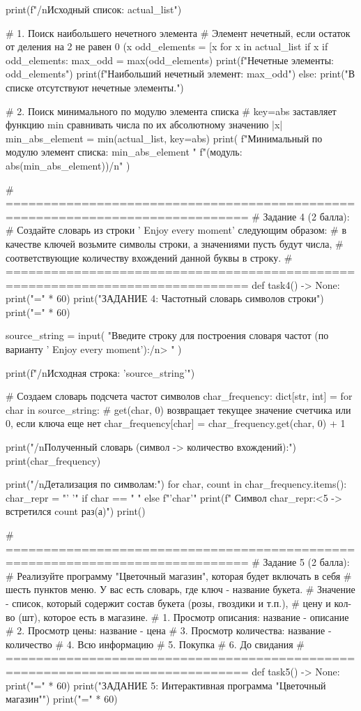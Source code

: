 \documentclass[14pt,a4paper]{extarticle}
\begin{document}
\begin{CodeListing}
    print(f"/nИсходный список: {actual_list}")

    # 1. Поиск наибольшего нечетного элемента
    # Элемент нечетный, если остаток от деления на 2 не равен 0 (x %
    odd_elements = [x for x in actual_list if x %
    if odd_elements:
        max_odd = max(odd_elements)
        print(f"Нечетные элементы: {odd_elements}")
        print(f"Наибольший нечетный элемент: {max_odd}")
    else:
        print("В списке отсутствуют нечетные элементы.")

    # 2. Поиск минимального по модулю элемента списка
    # key=abs заставляет функцию min сравнивать числа по их абсолютному значению |x|
    min_abs_element = min(actual_list, key=abs)
    print(
        f"Минимальный по модулю элемент списка: {min_abs_element} "
        f"(модуль: {abs(min_abs_element)})/n"
    )


# ==============================================================================
# Задание 4 (2 балла):
# Создайте словарь из строки ' Enjoy every moment' следующим образом:
# в качестве ключей возьмите символы строки, а значениями пусть будут числа,
# соответствующие количеству вхождений данной буквы в строку.
# ==============================================================================
def task4() -> None:
    print("=" * 60)
    print("ЗАДАНИЕ 4: Частотный словарь символов строки")
    print("=" * 60)

    source_string = input(
        "Введите строку для построения словаря частот (по варианту ' Enjoy every moment'):/n> "
    )

    print(f"/nИсходная строка: '{source_string}'")

    # Создаем словарь подсчета частот символов
    char_frequency: dict[str, int] = {}
    for char in source_string:
        # get(char, 0) возвращает текущее значение счетчика или 0, если ключа еще нет
        char_frequency[char] = char_frequency.get(char, 0) + 1

    print("/nПолученный словарь (символ -> количество вхождений):")
    print(char_frequency)

    print("/nДетализация по символам:")
    for char, count in char_frequency.items():
        char_repr = "' '" if char == " " else f"'{char}'"
        print(f"  Символ {char_repr:<5} -> встретился {count} раз(а)")
    print()


# ==============================================================================
# Задание 5 (2 балла):
# Реализуйте программу "Цветочный магазин", которая будет включать в себя
# шесть пунктов меню. У вас есть словарь, где ключ - название букета.
# Значение - список, который содержит состав букета (розы, гвоздики и т.п.),
# цену и кол-во (шт), которое есть в магазине.
# 1. Просмотр описания: название - описание
# 2. Просмотр цены: название - цена
# 3. Просмотр количества: название - количество
# 4. Всю информацию
# 5. Покупка
# 6. До свидания
# ==============================================================================
def task5() -> None:
    print("=" * 60)
    print("ЗАДАНИЕ 5: Интерактивная программа "Цветочный магазин"")
    print("=" * 60)


\end{CodeListing}
\end{document}
